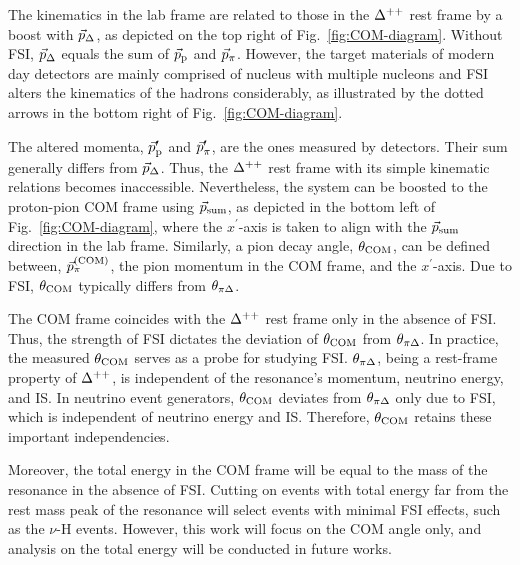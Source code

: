 The kinematics in the lab frame are related to those in the $\Delta^{++}$ rest frame by a boost with $\vec{p}_{\Delta}$, as depicted on the top right of Fig.~\ref{fig:COM-diagram}. 
Without FSI, $\vec{p}_{\Delta}$ equals the sum of $\vec{p}_\textrm{p}$ and $\vec{p}_{\pi}$.
However, the target materials of modern day detectors are mainly comprised of nucleus with multiple nucleons and FSI alters the kinematics of the hadrons considerably, as illustrated by the dotted arrows in the bottom right of Fig.~\ref{fig:COM-diagram}.

The altered momenta, $\vec{p}_\textrm{p}^{\prime}$ and $\vec{p}_{\pi}^{\prime}$, are the ones measured by detectors. 
Their sum generally differs from $\vec{p}_{\Delta}$.
Thus, the $\Delta^{++}$ rest frame with its simple kinematic relations becomes inaccessible.
Nevertheless, the system can be boosted to the proton-pion COM frame using $\vec{p}_{\textrm{sum}}$, as depicted in the bottom left of Fig.~\ref{fig:COM-diagram}, where the $x^{\prime}$-axis is taken to align with the $\vec{p}_{\textrm{sum}}$ direction in the lab frame.
Similarly, a pion decay angle, $\theta_{\textrm{COM}}$, can be defined between, $\vec{p}_{\pi}^{(\textrm{COM})}$, the pion momentum in the COM frame, and the $x^{\prime}$-axis.
Due to FSI, $\theta_{\textrm{COM}}$ typically differs from $\theta_{\pi\Delta}$. 

The COM frame coincides with the $\Delta^{++}$ rest frame only in the absence of FSI.
Thus, the strength of FSI dictates the deviation of $\theta_{\textrm{COM}}$ from $\theta_{\pi\Delta}$. 
In practice, the measured $\theta_{\textrm{COM}}$ serves as a probe for studying FSI. 
$\theta_{\pi\Delta}$, being a rest-frame property of $\Delta^{++}$, is independent of the resonance's momentum, neutrino energy, and IS.
In neutrino event generators, $\theta_{\textrm{COM}}$ deviates from $\theta_{\pi\Delta}$ only due to FSI, which is independent of neutrino energy and IS.
Therefore, $\theta_{\textrm{COM}}$ retains these important independencies.

Moreover, the total energy in the COM frame will be equal to the mass of the resonance in the absence of FSI.
Cutting on events with total energy far from the rest mass peak of the resonance will select events with minimal FSI effects, such as the $\nu$-H events. 
However, this work will focus on the COM angle only, and analysis on the total energy will be conducted in future works.

